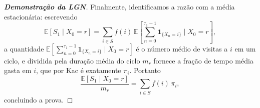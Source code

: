\documentclass[12pt,letterpaper]{article}
\begin{document}
\begin{proof}[\textbf{Demonstração da LGN}]
Finalmente, identificamos a razão com a média estacionária: escrevendo
\[
\mathbb E[S_1\mid X_0=r]
= \sum_{i\in S} f(i)\,\mathbb E\!\left[\sum_{n=0}^{\tau_1-1} 
\mathbf 1_{\{X_n=i\}} \mid X_0=r \right],
\]
a quantidade $\mathbb E[\sum_{n=0}^{\tau_1-1} \mathbf1_{\{X_n=i\}}\mid X_0=r]$ é o número médio de visitas a $i$ em um ciclo, e dividida pela duração média do ciclo $m_r$ fornece a fração de tempo média gasta em $i$, que por Kac é exatamente $\pi_i$. Portanto
\[
\frac{\mathbb E[S_1\mid X_0=r]}{m_r}
=\sum_{i\in S} f(i)\,\pi_i,
\]
concluindo a prova.
\end{proof}
\end{document}
